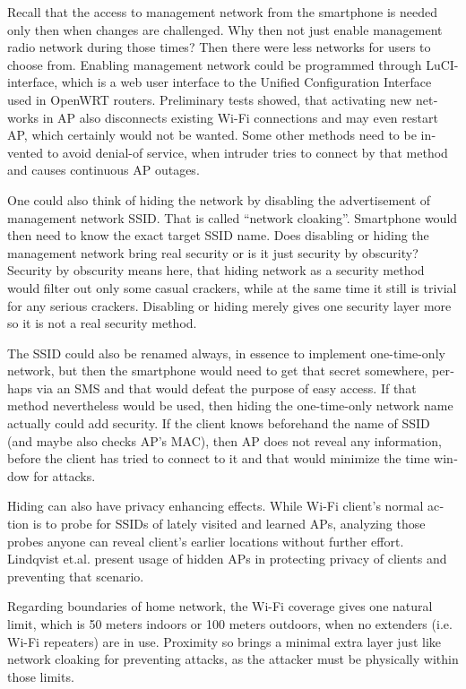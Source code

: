 \documentclass[12pt,a4paper,english]{tutthesis}
\begin{document}
\begin{otherlanguage}{english}
Recall that the access to management network from the smartphone is
 needed only then when changes
are challenged. Why then not just enable management radio network
during those times? Then there were less networks for users to choose from.
Enabling management network could be programmed through 
LuCI-interface, which is a web user interface to the Unified
 Configuration Interface used in OpenWRT routers.
Preliminary tests showed, that activating new networks in AP also 
disconnects existing Wi-Fi connections and may even restart AP,
which certainly would not be wanted. Some other methods need to
be invented to avoid denial-of service, when intruder tries to 
connect by that method and causes continuous AP outages.

\label{tag:hidessid}
One could also think of hiding the network by disabling the
advertisement of management network SSID. That is called ``network
cloaking''.  Smartphone would then need to know the exact target SSID name.
Does disabling or hiding the management network bring real security or
is it just security by obscurity?  Security by obscurity means here,
that hiding network 
as a security method would filter out only some casual crackers, while
at the same time it still is trivial for any serious crackers.
Disabling or hiding  merely gives one security layer more so it is not
a real security method.

The SSID could also be renamed always, in essence to implement
one-time-only network, but then the smartphone would need to get that
secret somewhere, perhaps via an SMS and that would defeat the purpose
of easy access.  If that method nevertheless would be used, then
hiding the one-time-only network name actually could add security. 
If the client knows beforehand the name of SSID
(and maybe also checks AP's MAC), then AP does not reveal any information,
before the client has tried to connect to it and that would minimize
the time window for attacks.




 Hiding can also have privacy enhancing effects.
While Wi-Fi client's normal action is to probe for SSIDs of lately visited
and learned APs, analyzing those probes anyone can reveal client's earlier
locations without further effort.
Lindqvist et.al.\cite{hidden-wlan} present usage of hidden
APs in protecting privacy of clients and preventing that scenario.



Regarding boundaries of home network, the Wi-Fi coverage gives 
one natural limit, which is 50 meters indoors or 100 meters outdoors,
when no extenders (i.e. Wi-Fi repeaters) are in use.
Proximity so brings a minimal extra layer just like network cloaking 
for preventing attacks, as the attacker must be physically within those limits.



\end{otherlanguage}
\end{document}
